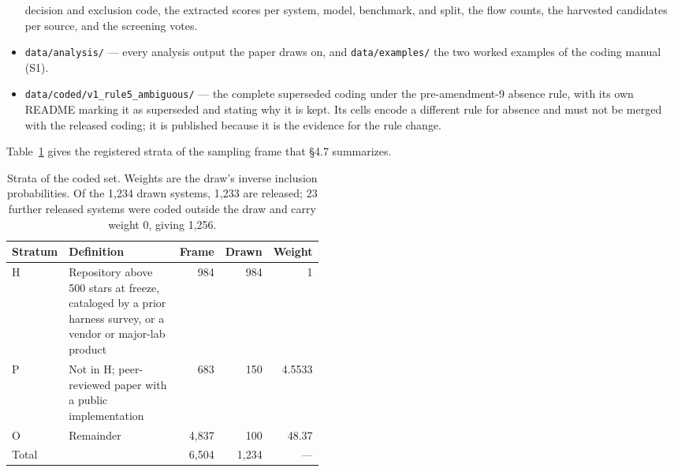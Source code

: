 \begin{itemize}
  decision and exclusion code, the extracted scores per system, model, benchmark, and split, the
  flow counts, the harvested candidates per source, and the screening votes.
\item \texttt{data/analysis/} --- every analysis output the paper draws on, and
  \texttt{data/examples/} the two worked examples of the coding manual (S1).
\item \texttt{data/coded/v1\_rule5\_ambiguous/} --- the complete superseded coding under the
  pre-amendment-9 absence rule, with its own README marking it as superseded and stating why it is
  kept. Its cells encode a different rule for absence and must not be merged with the released
  coding; it is published because it is the evidence for the rule change.
\end{itemize}

Table~\ref{tab:strata} gives the registered strata of the sampling frame that \S4.7 summarizes.

\begin{table}[htbp]
  \small
  \caption{Strata of the coded set. Weights are the draw's inverse inclusion probabilities. Of the 1,234
  drawn systems, 1,233 are released; 23 further released systems were coded outside the draw and carry
  weight 0, giving 1,256.}
  \label{tab:strata}
  \begin{tabular}{@{}l p{0.46\linewidth} r r r@{}}
    \toprule
    Stratum & Definition & Frame & Drawn & Weight \\
    \midrule
    H & Repository above 500 stars at freeze, cataloged by a prior harness survey, or a vendor or
        major-lab product & 984 & 984 & 1 \\
    P & Not in H; peer-reviewed paper with a public implementation & 683 & 150 & 4.5533 \\
    O & Remainder & 4,837 & 100 & 48.37 \\
    \midrule
    Total & & 6,504 & 1,234 & --- \\
    \bottomrule
  \end{tabular}
\end{table}

